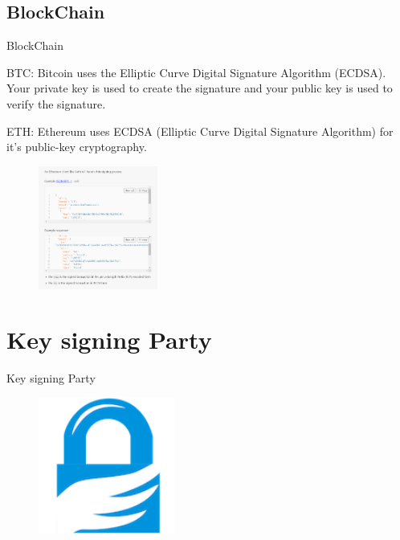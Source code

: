 \documentclass[UTF8]{ctexbeamer}
\begin{document}
\subsection{BlockChain}
\begin{frame}{BlockChain}

    BTC: Bitcoin uses the Elliptic Curve Digital Signature Algorithm (ECDSA). Your private key is used to create the signature and your public key is used to verify the signature.
    
    \vspace{1em}
    
    ETH: Ethereum uses ECDSA (Elliptic Curve Digital Signature Algorithm) for it's public-key cryptography.
    
    \begin{figure}
        \centering
        \includegraphics[width=0.35\textwidth]{eth.png}
    \end{figure}
\end{frame}

\section{Key signing Party}
\begin{frame}{Key signing Party}
    \begin{figure}
        \centering
        \includegraphics[width=0.4\textwidth]{gnupg.png}
    \end{figure}
\end{frame}
\end{document}
